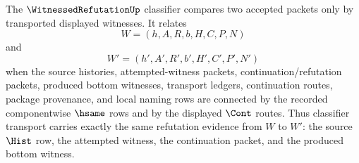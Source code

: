 \begin{definition}
\label{def:witnessed-refutation-classifier}
The $\WitnessedRefutationUp$ classifier compares two accepted packets only by transported displayed witnesses. It relates
$$
W=(h,A,R,b,H,C,P,N)
$$
and
$$
W'=(h',A',R',b',H',C',P',N')
$$
when the source histories, attempted-witness packets, continuation/refutation packets, produced bottom witnesses, transport ledgers, continuation routes, package provenance, and local naming rows are connected by the recorded componentwise $\hsame$ rows and by the displayed $\Cont$ routes. Thus classifier transport carries exactly the same refutation evidence from $W$ to $W'$: the source $\Hist$ row, the attempted witness, the continuation packet, and the produced bottom witness.
\end{definition}

